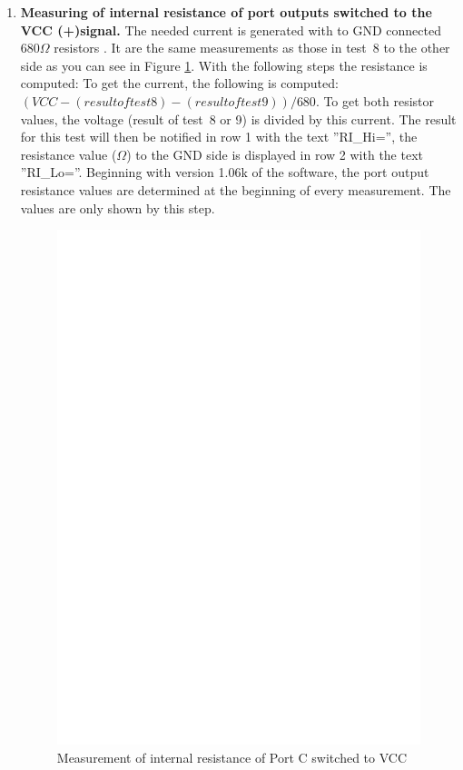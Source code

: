 \begin{enumerate}
\item {\bf Measuring of internal resistance of port outputs switched to the VCC (+)signal.}
The needed current is generated with to GND connected \(680\Omega\) resistors .
It are the same measurements as those in test~8 to the other side as you can see in Figure \ref{fig:test8}.
With the following steps the resistance is computed:
To get the current, the following is computed:  \((VCC - (result of test 8) - (result of test 9)) / 680\).
To get both resistor values, the voltage (result of test~8 or 9) is divided by this current.
The result for this test will then be notified in row 1 with the text ''RI\_Hi='', the resistance value (\(\Omega\)) to the GND side is
displayed in row 2 with the text ''RI\_Lo=''.
Beginning with version 1.06k of the software, the port output resistance values are determined at the beginning of every
measurement. The values are only shown by this step.

\begin{figure}[H]
\centering
\includegraphics[]{../FIG/Test8.eps}
\caption{Measurement of internal resistance of Port C switched to VCC }
\label{fig:test8}
\end{figure}


\end{enumerate}
